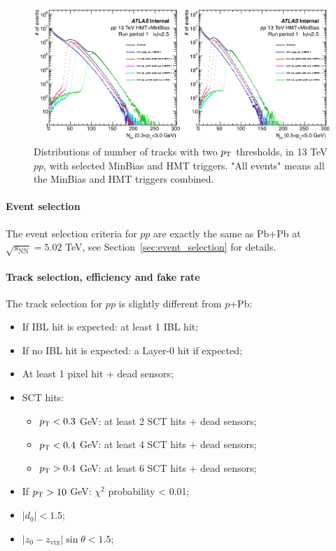 \begin{figure}[H]
\centering
\includegraphics[width=.95\linewidth]{figs/chapter_detector/ATLAS_trigger_pp13.png}
\caption{Distributions of number of tracks with two $p_\text{T}$ thresholds, in 13 TeV $pp$, with selected MinBias and HMT triggers. "All events" means all the MinBias and HMT triggers combined.}
\label{fig:detector_ATLAS_trigger_pp13}
\end{figure}



\paragraph{Event selection}

The event selection criteria for $pp$ are exactly the same as Pb+Pb at $\sqrt{s_\text{NN}}=5.02$ TeV, see Section~\ref{sec:event_selection} for details.



\paragraph{Track selection, efficiency and fake rate}

The track selection for $pp$ is slightly different from $p$+Pb:
\begin{itemize}
\item If IBL hit is expected: at least 1 IBL hit;
\item If no IBL hit is expected: a Layer-0 hit if expected;
\item At least 1 pixel hit + dead sensors;
\item SCT hits:
\begin{itemize}
\item $p_\text{T}<0.3$ GeV: at least 2 SCT hits + dead sensors;
\item $p_\text{T}<0.4$ GeV: at least 4 SCT hits + dead sensors;
\item $p_\text{T}>0.4$ GeV: at least 6 SCT hits + dead sensors;
\end{itemize}
\item If $p_\text{T}>10$ GeV: $\chi^2$ probability < 0.01;
\item $|d_0|<1.5$;
\item $|z_0-z_\text{vtx}|\sin\theta<1.5$;
\end{itemize}

